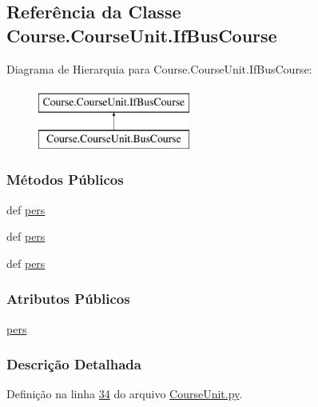 \hypertarget{classCourse_1_1CourseUnit_1_1IfBusCourse}{\subsection{Referência da Classe Course.\-Course\-Unit.\-If\-Bus\-Course}
\label{classCourse_1_1CourseUnit_1_1IfBusCourse}
}
Diagrama de Hierarquia para Course.\-Course\-Unit.\-If\-Bus\-Course\-:\begin{figure}[H]
\begin{center}
\leavevmode
\includegraphics[height=2.000000cm]{d0/d28/classCourse_1_1CourseUnit_1_1IfBusCourse}
\end{center}
\end{figure}
\subsubsection*{Métodos Públicos}
\begin{DoxyCompactItemize}
\item 
def \hyperlink{classCourse_1_1CourseUnit_1_1IfBusCourse_adf5702dec1a99bbb31936b7f1d425a40}{pers}
\item 
def \hyperlink{classCourse_1_1CourseUnit_1_1IfBusCourse_adf5702dec1a99bbb31936b7f1d425a40}{pers}
\item 
def \hyperlink{classCourse_1_1CourseUnit_1_1IfBusCourse_adf5702dec1a99bbb31936b7f1d425a40}{pers}
\end{DoxyCompactItemize}
\subsubsection*{Atributos Públicos}
\begin{DoxyCompactItemize}
\item 
\hyperlink{classCourse_1_1CourseUnit_1_1IfBusCourse_ab926ae8fb127b7697e2b63025df09a78}{pers}
\end{DoxyCompactItemize}


\subsubsection{Descrição Detalhada}


Definição na linha \hyperlink{CourseUnit_8py_source_l00034}{34} do arquivo \hyperlink{CourseUnit_8py_source}{Course\-Unit.\-py}.



